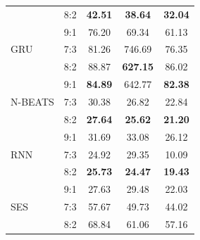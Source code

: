 \documentclass[conference]{IEEEtran}
\begin{document}
\begin{table}[H]
\begin{tabular}{|l|l|c|c|c|}
                               & 8:2                         & \textbf{42.51}            & \textbf{38.64}                 & \textbf{32.04}           \\ \cline{2-5}
                               & 9:1                         & 76.20                     & 69.34                          & 61.13                    \\ \hline
        GRU                    & 7:3                         & 81.26                     & 746.69                         & 76.35                    \\ \cline{2-5}
                               & 8:2                         & 88.87                     & \textbf{627.15}                & 86.02                    \\ \cline{2-5}
                               & 9:1                         & \textbf{84.89}            & 642.77                         & \textbf{82.38}           \\ \hline
        N-BEATS                & 7:3                         & 30.38                     & 26.82                          & 22.84                    \\ \cline{2-5}
                               & 8:2                         & \textbf{27.64}            & \textbf{25.62}                 & \textbf{21.20}           \\ \cline{2-5}
                               & 9:1                         & 31.69                     & 33.08                          & 26.12                    \\ \hline
        RNN                    & 7:3                         & 24.92                     & 29.35                          & 10.09                    \\ \cline{2-5}
                               & 8:2                         & \textbf{25.73}            & \textbf{24.47}                 & \textbf{19.43}           \\ \cline{2-5}
                               & 9:1                         & 27.63                     & 29.48                          & 22.03                    \\ \hline
        SES                    & 7:3                         & 57.67                     & 49.73                          & 44.02                    \\ \cline{2-5}
                               & 8:2                         & 68.84                     & 61.06                          & 57.16                    \\ \cline{2-5}

\end{tabular}
\end{table}
\end{document}
